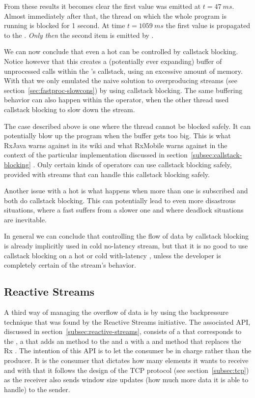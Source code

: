 From these results it becomes clear the first value was emitted at $t=47\ ms$. Almost immediately after that, the thread on which the whole program is running is blocked for 1 second. At time $t=1059\ ms$ the first value is propagated to the . \emph{Only then} the second item is emitted by .

We can now conclude that even a hot \obs can be controlled by callstack blocking. Notice however that this creates a (potentially ever expanding) buffer of unprocessed  calls within the 's callstack, using an excessive amount of memory. With that we only emulated the naive solution to overproducing streams (see section~\ref{sec:fastproc-slowcons}) by using callstack blocking. The same buffering behavior can also happen within the  operator, when the other thread used callstack blocking to slow down the stream.

The case described above is one where the thread cannot be blocked safely. It can potentially blow up the program when the buffer gets too big. This is what RxJava warns against in its wiki\cite{RxJava-Wiki-Callstack-Blocking} and what RxMobile warns against in the context of the particular  implementation discussed in section~\ref{subsec:callstack-blocking} \cite{RxMobile}. Only certain kinds of operators can use callstack blocking safely, provided with streams that can handle this callstack blocking safely.

Another issue with a hot \obs is what happens when more than one \obv is subscribed and both do callstack blocking. This can potentially lead to even more disastrous situations, where a fast \obv suffers from a slower one and where deadlock situations are inevitable.

In general we can conclude that controlling the flow of data by callstack blocking is already implicitly used in cold no-latency stream, but that it is no good to use callstack blocking on a hot or cold with-latency \obs, unless the developer is completely certain of the stream's behavior.

\subsection{Reactive Streams}
A third way of managing the overflow of data is by using the backpressure technique that was found by the Reactive Streams initiative. The associated API, discussed in section~\ref{subsec:reactive-streams}, consists of a  that corresponds to the \obs, a  that adds an  method to the \obv and a  with a  and  method that replaces the Rx \subs. The intention of this API is to let the consumer be in charge rather than the producer. It is the consumer that dictates how many elements it wants to receive and with that it follows the design of the TCP protocol (see section~\ref{subsec:tcp}) as the receiver also sends window size updates (how much more data it is able to handle) to the sender.

